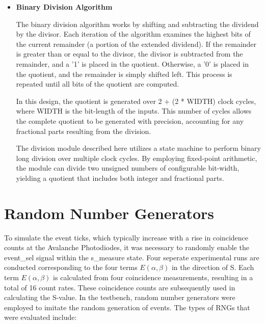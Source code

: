 \begin{itemize}
\begin{itemize}
	\begin{lstlisting}
		when s_done => 
			quotient <= temp_quotient;
			done <= '1';
			count <= 0;
			state <= s_idle;
	\end{lstlisting}
	
\end{itemize}

The state machine ensures that the division operation is synchronized with the clock and that all necessary steps are performed in a sequential manner. The FSM is triggered on the rising edge of the clock, and the division process takes several clock cycles, depending on the bit-width of the inputs.

\item [$\rightarrow$] \textbf{Binary Division Algorithm}

The binary division algorithm works by shifting and subtracting the dividend by the divisor. Each iteration of the algorithm examines the highest bits of the current remainder (a portion of the extended dividend). If the remainder is greater than or equal to the divisor, the divisor is subtracted from the remainder, and a '1' is placed in the quotient. Otherwise, a '0' is placed in the quotient, and the remainder is simply shifted left. This process is repeated until all bits of the quotient are computed.

In this design, the quotient is generated over 2 + (2 * WIDTH) clock cycles, where WIDTH is the bit-length of the inputs. This number of cycles allows the complete quotient to be generated with precision, accounting for any fractional parts resulting from the division.

The division module described here utilizes a state machine to perform binary long division over multiple clock cycles. By employing fixed-point arithmetic, the module can divide two unsigned numbers of configurable bit-width, yielding a quotient that includes both integer and fractional parts.

\end{itemize}

\section{Random Number Generators}

To simulate the event ticks, which typically increase with a rise in coincidence counts at the Avalanche Photodiodes, it was necessary to randomly enable the event\_sel signal within the s\_measure state. Four seperate experimental runs are conducted corresponding to the four terms $E(\alpha, \beta)$ in the direction of S. Each term $E(\alpha, \beta)$ is calculated from four coincidence measurements, resulting in a total of 16 count rates. These coincidence counts are subsequently used in calculating the S-value. 
In the testbench, random number generators were employed to imitate the random generation of events. The types of RNGs that were evaluated include:

